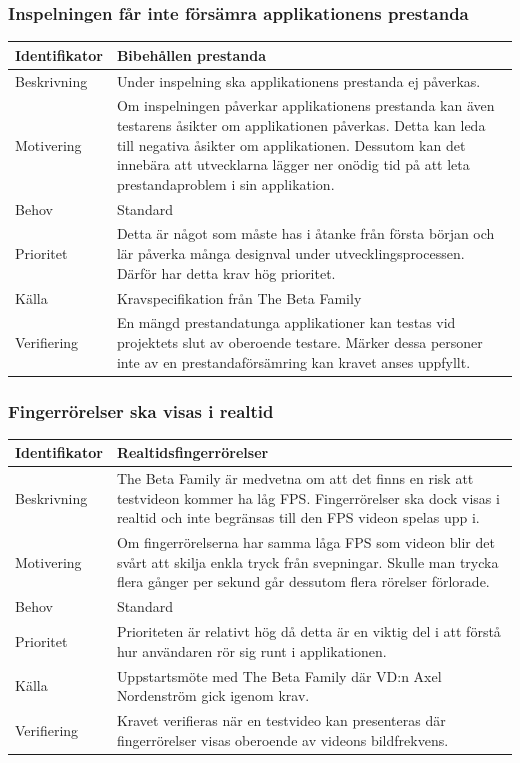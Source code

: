 \subsubsection{Inspelningen får inte försämra applikationens prestanda}
\begin{tabular}{ | p{65pt} | p{300pt} |}
  \hline
  Identifikator &
  Bibehållen prestanda
  \\ \hline
  Beskrivning & 
  Under inspelning ska applikationens prestanda ej påverkas.
  \\ \hline
  Motivering &
  Om inspelningen påverkar applikationens prestanda kan även testarens åsikter om applikationen påverkas. Detta kan leda till negativa åsikter om applikationen. Dessutom kan det innebära att utvecklarna lägger ner onödig tid på att leta prestandaproblem i sin applikation.
  \\ \hline
  Behov &
Standard
  \\ \hline
  Prioritet &
  Detta är något som måste has i åtanke från första början och lär påverka många designval under utvecklingsprocessen. Därför har detta krav hög prioritet.
  \\ \hline
  Källa &
  Kravspecifikation från The Beta Family
  \\ \hline
  Verifiering &
  En mängd prestandatunga applikationer kan testas vid projektets slut av oberoende testare. Märker dessa personer inte av en prestandaförsämring kan kravet anses uppfyllt.
  \\ \hline
\end{tabular}

\subsubsection{Fingerrörelser ska visas i realtid}
\begin{tabular}{ | p{65pt} | p{300pt} |}
  \hline
  Identifikator &
  Realtidsfingerrörelser
  \\ \hline
  Beskrivning & 
  The Beta Family är medvetna om att det finns en risk att testvideon kommer ha låg FPS. Fingerrörelser ska dock visas i realtid och inte begränsas till den FPS videon spelas upp i.
  \\ \hline
  Motivering &
  Om fingerrörelserna har samma låga FPS som videon blir det svårt att skilja enkla tryck från svepningar. Skulle man trycka flera gånger per sekund går dessutom flera rörelser förlorade.
  \\ \hline
  Behov &
  Standard
  \\ \hline
  Prioritet &
  Prioriteten är relativt hög då detta är en viktig del i att förstå hur användaren rör sig runt i applikationen.
  \\ \hline
  Källa &
  Uppstartsmöte med The Beta Family där VD:n Axel Nordenström gick igenom krav.
  \\ \hline
  Verifiering &
  Kravet verifieras när en testvideo kan presenteras där fingerrörelser visas oberoende av videons bildfrekvens.
  \\ \hline
\end{tabular}

